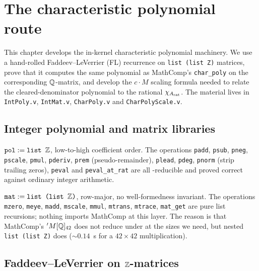 \chapter{The characteristic polynomial route}\label{ch:charpoly}

This chapter develops the in-kernel characteristic polynomial
machinery. We use a hand-rolled Faddeev--LeVerrier (FL) recurrence on
\texttt{list (list Z)} matrices, prove that it computes the same
polynomial as MathComp's \texttt{char\_poly} on the corresponding
$\mathbb{Q}$-matrix, and develop the $c \cdot M$ scaling formula needed to
relate the cleared-denominator polynomial to the rational
$\chi_{A_{\mathrm{rat}}}$. The material lives in
\texttt{IntPoly.v}, \texttt{IntMat.v}, \texttt{CharPoly.v} and
\texttt{CharPolyScale.v}.

\section{Integer polynomial and matrix libraries}

\begin{definition}\label{def:pol}
\rocqok
$\texttt{pol} := \texttt{list }\mathbb{Z}$, low-to-high coefficient order. The
operations \texttt{padd}, \texttt{psub}, \texttt{pneg}, \texttt{pscale},
\texttt{pmul}, \texttt{pderiv}, \texttt{prem} (pseudo-remainder),
\texttt{plead}, \texttt{pdeg}, \texttt{pnorm} (strip trailing zeros),
\texttt{peval} and \texttt{peval\_at\_rat} are all
\vmcompute-reducible and proved correct against ordinary integer
arithmetic.
\end{definition}

\begin{definition}\label{def:mat}
\rocqok
$\texttt{mat} := \texttt{list (list }\mathbb{Z}\texttt{)}$, row-major, no
well-formedness invariant. The operations \texttt{mzero},
\texttt{meye}, \texttt{madd}, \texttt{mscale}, \texttt{mmul},
\texttt{mtrans}, \texttt{mtrace}, \texttt{mat\_get} are pure list
recursions; nothing imports MathComp at this layer. The reason is that
MathComp's $'M[\mathbb{Q}]_{42}$ does not reduce under \vmcompute{} at the
sizes we need, but nested \texttt{list (list Z)} does
(${\sim}0.14$~s for a $42 \times 42$ multiplication).
\end{definition}

\section{Faddeev--LeVerrier on \texorpdfstring{$\mathbb{Z}$}{Z}-matrices}

